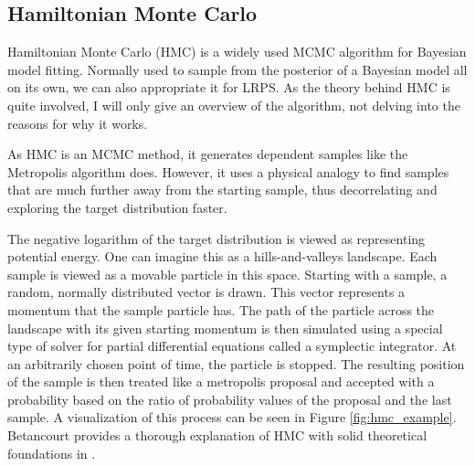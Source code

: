 \documentclass[12pt, a4paper]{report}
\begin{document}
\subsection{Hamiltonian Monte Carlo}
Hamiltonian Monte Carlo (HMC) is a widely used MCMC algorithm for Bayesian model fitting.
Normally used to sample from the posterior of a Bayesian model all on its own, we can also appropriate it for LRPS.
As the theory behind HMC is quite involved, I will only give an overview of the algorithm, not delving into the reasons for why it works.

As HMC is an MCMC method, it generates dependent samples like the Metropolis algorithm does.
However, it uses a physical analogy to find samples that are much further away from the starting sample, thus decorrelating and exploring the target distribution faster.

The negative logarithm of the target distribution is viewed as representing potential energy.
One can imagine this as a hills-and-valleys landscape.
Each sample is viewed as a movable particle in this space.
Starting with a sample, a random, normally distributed vector is drawn.
This vector represents a momentum that the sample particle has.
The path of the particle across the landscape with its given starting momentum is then simulated using a special type of solver for partial differential equations called a symplectic integrator.
At an arbitrarily chosen point of time, the particle is stopped.
The resulting position of the sample is then treated like a metropolis proposal and accepted with a probability based on the ratio of probability values of the proposal and the last sample.
A visualization of this process can be seen in Figure \ref{fig:hmc_example}.
Betancourt provides a thorough explanation of HMC with solid theoretical foundations in \cite{hmc}.
\end{document}
